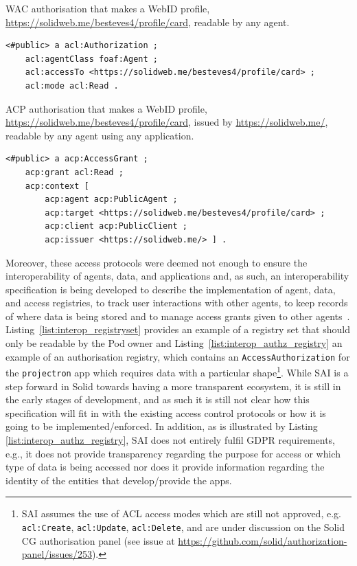 \begin{listing}[h]
\caption[WAC authorisation that makes a WebID profile, readable by any agent.]{WAC authorisation that makes a WebID profile, \url{https://solidweb.me/besteves4/profile/card}, readable by any agent.}
\label{list:wac}
\begin{verbatim}
<#public> a acl:Authorization ;
    acl:agentClass foaf:Agent ;
    acl:accessTo <https://solidweb.me/besteves4/profile/card> ;
    acl:mode acl:Read .
\end{verbatim}
\end{listing}

\begin{listing}[h]
\caption[ACP authorisation that makes a WebID profile, issued by \url{https://solidweb.me/}, readable by any agent using any application.]{ACP authorisation that makes a WebID profile, \url{https://solidweb.me/besteves4/profile/card}, issued by \url{https://solidweb.me/}, readable by any agent using any application.}
\label{list:acp}
\begin{verbatim}
<#public> a acp:AccessGrant ;
    acp:grant acl:Read ;
    acp:context [
        acp:agent acp:PublicAgent ;
        acp:target <https://solidweb.me/besteves4/profile/card> ;
        acp:client acp:PublicClient ;
        acp:issuer <https://solidweb.me/> ] .
\end{verbatim}
\end{listing}

Moreover, these access protocols were deemed not enough to ensure the interoperability of agents, data, and applications and, as such, an interoperability specification is being developed to describe the implementation of agent, data, and access registries, to track user interactions with other agents, to keep records of where data is being stored and to manage access grants given to other agents~\citep{bingham_interop_2023}.
Listing~\ref{list:interop_registryset} provides an example of a registry set that should only be readable by the Pod owner and Listing~\ref{list:interop_authz_registry} an example of an authorisation registry, which contains an \texttt{AccessAuthorization} for the \texttt{projectron} app which requires data with a particular shape\footnote{SAI assumes the use of ACL access modes which are still not approved, e.g. \texttt{acl:Create}, \texttt{acl:Update}, \texttt{acl:Delete}, and are under discussion on the Solid CG authorisation panel (see issue at \url{https://github.com/solid/authorization-panel/issues/253}).}. While SAI is a step forward in Solid towards having a more transparent ecosystem, it is still in the early stages of development, and as such it is still not clear how this specification will fit in with the existing access control protocols or how it is going to be implemented/enforced.
In addition, as is illustrated by Listing \ref{list:interop_authz_registry}, SAI does not entirely fulfil GDPR requirements, e.g., it does not provide transparency regarding the purpose for access or which type of data is being accessed nor does it provide information regarding the identity of the entities that develop/provide the apps.

